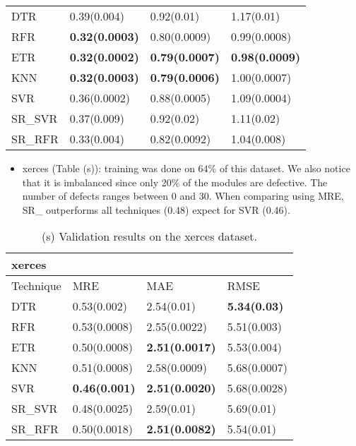 \documentclass[]{article}
\begin{document}
\begin{table}[h]
\begin{adjustwidth}{-3.4cm}{}
\begin{subtable}{9.5cm}
\begin{tabular}{llll}
					DTR       & 0.39(0.004) & 0.92(0.01) & 1.17(0.01) \\
					RFR       & \bfseries 0.32(0.0003) & 0.80(0.0009) & 0.99(0.0008) \\
					ETR       & \bfseries 0.32(0.0002) & \bfseries 0.79(0.0007) & \bfseries 0.98(0.0009) \\
					KNN       & \bfseries 0.32(0.0003) & \bfseries 0.79(0.0006) & 1.00(0.0007) \\
					SVR       & 0.36(0.0002) & 0.88(0.0005) & 1.09(0.0004) \\
					SR\_SVR    & 0.37(0.009) & 0.92(0.02) & 1.11(0.02) \\
					SR\_RFR    & 0.33(0.004) & 0.82(0.0092) & 1.04(0.008) \\ \hline
				\end{tabular}
			\end{subtable} 
		\end{adjustwidth}
	\end{table}
\FloatBarrier
	\begin{itemize}
	\item xerces (Table (s)): training was done on 64\% of this dataset. We also notice that it is imbalanced since only 20\% of the modules are defective. The number of defects ranges between 0 and 30. When comparing using MRE, SR\_ outperforms all techniques (0.48) expect for SVR (0.46).
\end{itemize}
\FloatBarrier
		\begin{table}[h]
	\captionsetup[subtable]{labelformat=empty}
	\begin{adjustwidth}{1.5cm}{}
		\begin{subtable}{9cm}
			\centering
			\caption{(s) Validation results on the xerces dataset.}
			\label{tab:xalan-wv}
			\begin{tabular}{llll}
				\hline
				xerces &              &              &              \\ \hline
				Technique  & MRE          & MAE          & RMSE    \\ \hline
				DTR        & 0.53(0.002) & 2.54(0.01) & \bfseries 5.34(0.03)  \\
				RFR        & 0.53(0.0008) & 2.55(0.0022) & 5.51(0.003) \\
				ETR        & 0.50(0.0008) & \bfseries 2.51(0.0017) & 5.53(0.004) \\
				KNN        & 0.51(0.0008) & 2.58(0.0009) & 5.68(0.0007) \\
				SVR        & \bfseries 0.46(0.001) & \bfseries 2.51(0.0020) & 5.68(0.0028)  \\
				SR\_SVR     & 0.48(0.0025) & 2.59(0.01) & 5.69(0.01)  \\
				SR\_RFR     & 0.50(0.0018) & \bfseries 2.51(0.0082) & 5.54(0.01) \\ \hline
			\end{tabular}
		\end{subtable}
	\end{adjustwidth}
\end{table}
\end{document}
